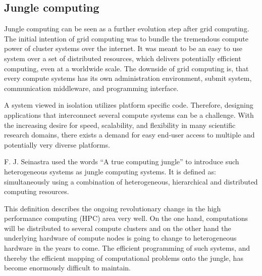 \subsection{Jungle computing}
\label{sec:jungle}
Jungle computing can be seen as a further evolution step after grid
computing. The initial intention of grid computing was to
bundle the tremendous compute power of cluster systems over the
internet\cite{ref:grid}. It was meant to be an easy to use system over a
set of distributed resources, which delivers potentially efficient
computing, even at a worldwide scale.  The downside of grid computing
is, that every compute systems has its own administration environment,
submit system, communication middleware, and programming interface.

A system viewed in isolation utilizes platform specific
code. Therefore, designing applications that interconnect several
compute systems can be a challenge.  With the increasing desire for
speed, scalability, and flexibility in many scientific research
domains, there exists a demand for easy end-user access to multiple
and potentially very diverse platforms.

F. J. Seinastra used the words ``A true computing jungle''
to introduce such heterogeneous systems as jungle computing
systems\cite{ref:jungle}. It is defined as: simultaneously using a
combination of heterogeneous, hierarchical and distributed computing
resources.

This definition describes the ongoing revolutionary change in the high
performance computing (HPC) area very well. On the one hand,
computations will be distributed to several compute clusters and on
the other hand the underlying hardware of compute nodes is going to
change to heterogeneous hardware in the years to come. The efficient
programming of such systems, and thereby the efficient mapping of
computational problems onto the jungle, has become enormously difficult
to maintain.


